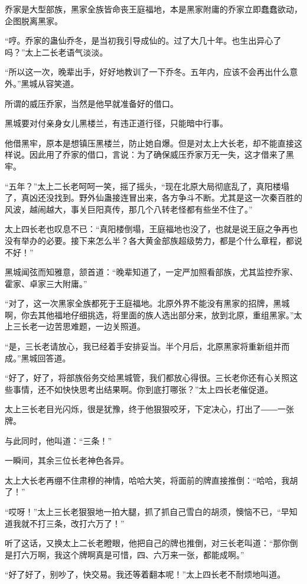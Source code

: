 \begin{this_body}
乔家是大型部族，黑家全族皆命丧王庭福地，本是黑家附庸的乔家立即蠢蠢欲动，企图脱离黑家。

“哼。乔家的蛊仙乔冬，是当初我引导成仙的。过了大几十年。也生出异心了吗？”太上二长老语气淡淡。

“所以这一次，晚辈出手，好好地教训了一下乔冬。五年内，应该不会再出什么意外。”黑城从容笑道。

所谓的威压乔家，当然是他早就准备好的借口。

黑城要对付亲身女儿黑楼兰，有违正道行径，只能暗中行事。

他借黑牢，原本是想镇压黑楼兰，防止她自爆。但是对太上大长老，却不能直接这样说。因此用了乔家的借口，言说：为了确保威压乔家万无一失，这才借来了黑牢。

“五年？”太上二长老呵呵一笑，摇了摇头，“现在北原大局彻底乱了，真阳楼塌了，真凶还没找到。野外仙蛊接连冒出来，各方争斗不断。尤其是这一次秦百胜的风波，越闹越大，事关巨阳真传，那几个八转老怪都有些坐不住了。”

太上四长老也叹息不已：“真阳楼倒塌，王庭福地也没了，也就是说王庭之争再也没有举办的必要。接下来怎么半？各大黄金部族超级势力，都是个什么章程，都说不好！”

黑城闻弦而知雅意，颔首道：“晚辈知道了，一定严加照看部族，尤其监控乔家、霍家、卓家三大附庸。”

“对了，这一次黑家全族都死于王庭福地。北原外界不能没有黑家的招牌，黑城啊，你去其他福地仔细挑选，将里面的族人选出部分来，放到北原，重组黑家。”太上三长老一边苦思难题，一边关照道。

“是，三长老请放心，我已经着手安排妥当。半个月后，北原黑家将重新组并而成。”黑城回答道。

“好了，好了，将部族俗务交给黑城管，我们都放心得很。三长老你还有心关照这些事情，还不如快快思考出结果啊。你到底打哪张？”太上四长老催促道。

太上三长老目光闪烁，很是犹豫，终于他狠狠咬牙，下定决心，打出了――一张牌。

与此同时，他叫道：“三条！”

一瞬间，其余三位长老神色各异。

太上大长老再绷不住肃穆的神情，哈哈大笑，将面前的牌直接推倒：“哈哈，我胡了！”

“哎呀！”太上三长老狠狠地一拍大腿，抓了抓自己雪白的胡须，懊恼不已，“早知道我就不打三条，改打六万了！”

听了这话，又换太上二长老瞪眼，他把自己的牌也推倒，对三长老叫道：“那你倒是打六万啊，我这个牌啊真是可惜，四、六万来一张，都能成啊。”

“好了好了，别吵了，快交易。我还等着翻本呢！”太上四长老不耐烦地叫道。


\end{this_body}
